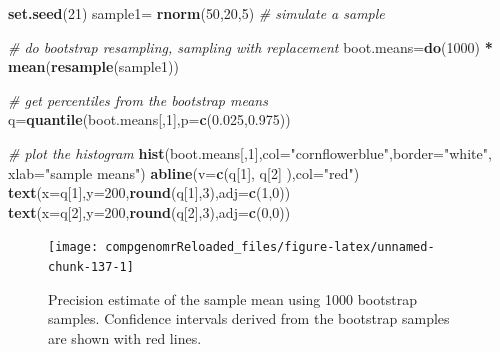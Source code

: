 \documentclass[12pt,]{krantz}
\newenvironment{Shaded}{\begin{snugshade}}{\end{snugshade}}
\newcommand{\CommentTok}[1]{\textcolor[rgb]{0.56,0.35,0.01}{\textit{#1}}}
\newcommand{\DataTypeTok}[1]{\textcolor[rgb]{0.13,0.29,0.53}{#1}}
\newcommand{\DecValTok}[1]{\textcolor[rgb]{0.00,0.00,0.81}{#1}}
\newcommand{\FloatTok}[1]{\textcolor[rgb]{0.00,0.00,0.81}{#1}}
\newcommand{\KeywordTok}[1]{\textcolor[rgb]{0.13,0.29,0.53}{\textbf{#1}}}
\newcommand{\NormalTok}[1]{#1}
\newcommand{\OperatorTok}[1]{\textcolor[rgb]{0.81,0.36,0.00}{\textbf{#1}}}
\newcommand{\StringTok}[1]{\textcolor[rgb]{0.31,0.60,0.02}{#1}}
\theoremstyle{definition}
\theoremstyle{definition}
\theoremstyle{definition}
\theoremstyle{remark}
\begin{document}
\begin{Shaded}
\begin{Highlighting}[]
\KeywordTok{set.seed}\NormalTok{(}\DecValTok{21}\NormalTok{)}
\NormalTok{sample1=}\StringTok{ }\KeywordTok{rnorm}\NormalTok{(}\DecValTok{50}\NormalTok{,}\DecValTok{20}\NormalTok{,}\DecValTok{5}\NormalTok{) }\CommentTok{# simulate a sample}

\CommentTok{# do bootstrap resampling, sampling with replacement}
\NormalTok{boot.means=}\KeywordTok{do}\NormalTok{(}\DecValTok{1000}\NormalTok{) }\OperatorTok{*}\StringTok{ }\KeywordTok{mean}\NormalTok{(}\KeywordTok{resample}\NormalTok{(sample1))}

\CommentTok{# get percentiles from the bootstrap means}
\NormalTok{q=}\KeywordTok{quantile}\NormalTok{(boot.means[,}\DecValTok{1}\NormalTok{],}\DataTypeTok{p=}\KeywordTok{c}\NormalTok{(}\FloatTok{0.025}\NormalTok{,}\FloatTok{0.975}\NormalTok{))}

\CommentTok{# plot the histogram}
\KeywordTok{hist}\NormalTok{(boot.means[,}\DecValTok{1}\NormalTok{],}\DataTypeTok{col=}\StringTok{"cornflowerblue"}\NormalTok{,}\DataTypeTok{border=}\StringTok{"white"}\NormalTok{,}
                    \DataTypeTok{xlab=}\StringTok{"sample means"}\NormalTok{)}
\KeywordTok{abline}\NormalTok{(}\DataTypeTok{v=}\KeywordTok{c}\NormalTok{(q[}\DecValTok{1}\NormalTok{], q[}\DecValTok{2}\NormalTok{] ),}\DataTypeTok{col=}\StringTok{"red"}\NormalTok{)}
\KeywordTok{text}\NormalTok{(}\DataTypeTok{x=}\NormalTok{q[}\DecValTok{1}\NormalTok{],}\DataTypeTok{y=}\DecValTok{200}\NormalTok{,}\KeywordTok{round}\NormalTok{(q[}\DecValTok{1}\NormalTok{],}\DecValTok{3}\NormalTok{),}\DataTypeTok{adj=}\KeywordTok{c}\NormalTok{(}\DecValTok{1}\NormalTok{,}\DecValTok{0}\NormalTok{))}
\KeywordTok{text}\NormalTok{(}\DataTypeTok{x=}\NormalTok{q[}\DecValTok{2}\NormalTok{],}\DataTypeTok{y=}\DecValTok{200}\NormalTok{,}\KeywordTok{round}\NormalTok{(q[}\DecValTok{2}\NormalTok{],}\DecValTok{3}\NormalTok{),}\DataTypeTok{adj=}\KeywordTok{c}\NormalTok{(}\DecValTok{0}\NormalTok{,}\DecValTok{0}\NormalTok{))}
\end{Highlighting}
\end{Shaded}

\begin{figure}

{\centering \texttt{[image: compgenomrReloaded\_files/figure-latex/unnamed-chunk-137-1]} 

}

\caption{Precision estimate of the sample mean using 1000 bootstrap samples. Confidence intervals derived from the bootstrap samples are shown with red lines.}\label{fig:unnamed-chunk-137}
\end{figure}
\end{document}
